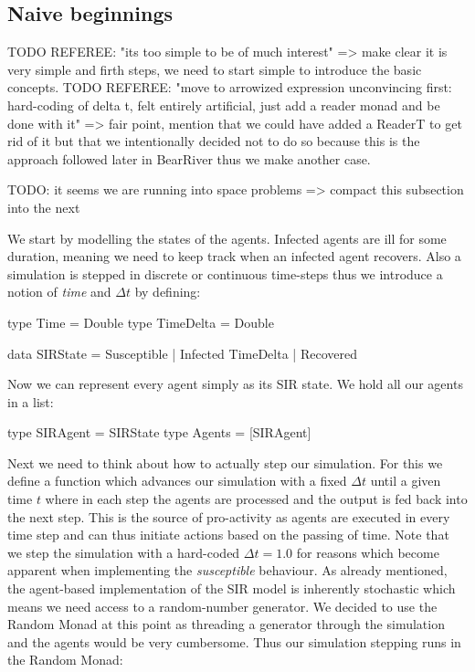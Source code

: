 \subsection{Naive beginnings}
\label{sec:naive_beginnigs}
TODO REFEREE: "its too simple to be of much interest" => make clear it is very simple and firth steps, we need to start simple to introduce the basic concepts.
TODO REFEREE: "move to arrowized expression unconvincing first: hard-coding of delta t, felt entirely artificial, just add a reader monad and be done with it" => fair point, mention that we could have added a ReaderT to get rid of it but that we intentionally decided not to do so because this is the approach followed later in BearRiver thus we make another case.

TODO: it seems we are running into space problems => compact this subsection into the next

We start by modelling the states of the agents. Infected agents are ill for some duration, meaning we need to keep track when an infected agent recovers. Also a simulation is stepped in discrete or continuous time-steps thus we introduce a notion of \textit{time} and $\Delta t$ by defining:

\begin{HaskellCode}
type Time      = Double
type TimeDelta = Double

data SIRState = Susceptible | Infected TimeDelta | Recovered
\end{HaskellCode}

Now we can represent every agent simply as its SIR state. We hold all our agents in a list:
\begin{HaskellCode}
type SIRAgent = SIRState
type Agents   = [SIRAgent]
\end{HaskellCode}

Next we need to think about how to actually step our simulation. For this we define a function which advances our simulation with a fixed $\Delta t$ until a given time $t$ where in each step the agents are processed and the output is fed back into the next step. This is the source of pro-activity as agents are executed in every time step and can thus initiate actions based on the passing of time. Note that we step the simulation with a hard-coded $\Delta t = 1.0$ for reasons which become apparent when implementing the \textit{susceptible} behaviour.
As already mentioned, the agent-based implementation of the SIR model is inherently stochastic which means we need access to a random-number generator. We decided to use the Random Monad at this point as threading a generator through the simulation and the agents would be very cumbersome. Thus our simulation stepping runs in the Random Monad:

